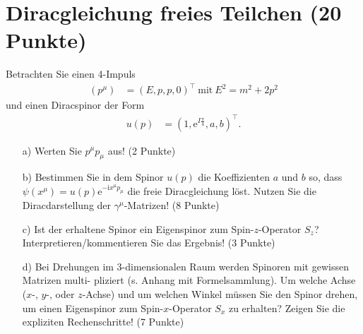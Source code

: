 \documentclass[german, parskip=full]{scrartcl}
\title{\titel}
\author{100 Punkte entsprechen 100\%}
\date{am 05.08.2021}
\newcommand{\tecxt}{}
\newcommand{\I}{\text{i}}
\newcommand{\e}{\text{e}}
\begin{document}
\maketitle  %

\section{Diracgleichung freies Teilchen (20 Punkte)}
Betrachten Sie einen 4-Impuls 
\begin{align}
(p^\mu)&=(E,p,p,0)^\top\ \tecxt\text{mit}\ E^2=m^2+2p^2 \label{eqn:VierImpuls}
\end{align}
und einen Diracspinor der Form
\begin{align}
u(p)&=(1,\e^{I\frac{\pi}{4}},a,b)^\top .  \label{eqn:Diracspinor}
\end{align}
\begin{enumerate}
\item[a)] Werten Sie $p^\mu p_\mu$ aus! (2 Punkte)
\item[b)] Bestimmen Sie in dem Spinor $u(p)$ die Koeffizienten $a$ und $b$ so, dass $\psi(x^\mu) = u(p)\e^{-\I x^\mu p_\mu}$ die freie Diracgleichung löst. 
Nutzen Sie die Diracdarstellung der $\gamma^\mu $-Matrizen! (8 Punkte)
\item[c)] Ist der erhaltene Spinor ein Eigenspinor zum Spin-$z$-Operator $S_z$? 
Interpretieren/kommentieren Sie das Ergebnis! (3 Punkte)
\item[d)] Bei Drehungen im 3-dimensionalen Raum werden Spinoren mit gewissen Matrizen multi-
pliziert (s. Anhang mit Formelsammlung). 
Um welche Achse ($x$-, $y$-, oder $z$-Achse) und um
welchen Winkel müssen Sie den Spinor drehen, um einen Eigenspinor zum Spin-$x$-Operator
$S_x$ zu erhalten? 
Zeigen Sie die expliziten Rechenschritte! (7 Punkte)
\end{enumerate}
\newpage
\end{document}
